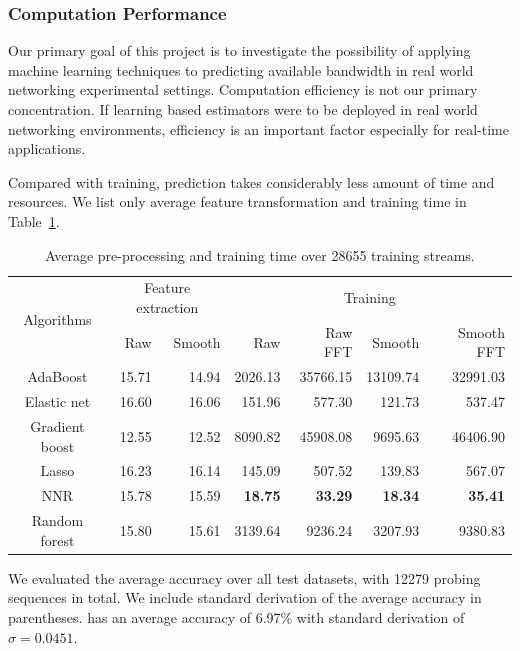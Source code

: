 \subsubsection{Computation Performance}
\label{ssub:computation_performance}

Our primary goal of this project is to investigate the possibility of applying
machine learning techniques to predicting available bandwidth in real world
networking experimental settings. Computation efficiency is not our primary
concentration. If learning based estimators were to be deployed in real world
networking environments, efficiency is an important factor especially for
real-time applications.

Compared with training, prediction takes considerably less amount of time and
resources. We list only average feature transformation and training time in
Table~\ref{tab:timing}.

\begin{table}[htpb]
   \centering
   \caption{Average pre-processing and training time over 28655 training streams.}
   \label{tab:timing}
   \begin{tabular}{|c|r|r|r|r|r|r|}
      \hline
      \multirow{2}{*}{Algorithms} & \multicolumn{2}{c|}{Feature extraction} &
      \multicolumn{4}{c|}{Training} \\ \cline{2-7}
                       & Raw   & Smooth & Raw            & Raw FFT        & Smooth         & Smooth FFT \\ \hline
      AdaBoost         & 15.71 & 14.94  & 2026.13        & 35766.15       & 13109.74       & 32991.03\\
      Elastic net      & 16.60 & 16.06  & 151.96         & 577.30         & 121.73         & 537.47\\
      Gradient boost   & 12.55 & 12.52  & 8090.82        & 45908.08       & 9695.63        & 46406.90\\
      Lasso            & 16.23 & 16.14  & 145.09         & 507.52         & 139.83         & 567.07\\
      NNR              & 15.78 & 15.59  & \textbf{18.75} & \textbf{33.29} & \textbf{18.34} & \textbf{35.41}\\
      Random forest    & 15.80 & 15.61  & 3139.64        & 9236.24        & 3207.93        & 9380.83\\
      \hline
   \end{tabular}
\end{table}

We evaluated the average accuracy over all test datasets, with 12279 probing
sequences in total. We include standard derivation of the average
accuracy in parentheses. \cite{Yin2014} has an average accuracy of 6.97\%
with standard derivation of $\sigma=0.0451$.

